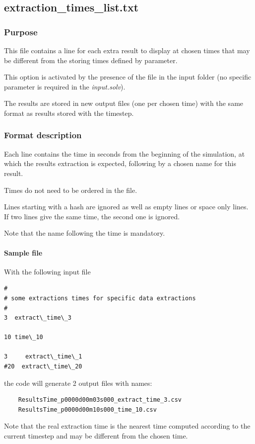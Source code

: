 \subsection{extraction\_times\_list.txt}
\subsubsection{Purpose}

This file contains a line for each extra result to display at chosen times that may be different from the storing times defined by  parameter.

This option is activated by the presence of the file in the input folder (no specific parameter is required in the \emph{input.solv}).

The results are stored in new output files (one per chosen time) with the same format as results stored with the  timestep. 

\subsubsection{Format description}
 Each line contains the time in seconds from the beginning of the simulation, at which the results extraction is expected, following by a chosen name for this result.

Times do not need to be ordered in the file.

Lines starting with a hash are ignored as well as empty lines or space only lines.
If two lines give the same time, the second one is ignored. 

Note that the name following the time is mandatory.
\paragraph*{Sample file}
With the following input file

\begin{verbatim}
#
# some extractions times for specific data extractions
#
3  extract\_time\_3

10 time\_10
  
3     extract\_time\_1
#20  extract\_time\_20
\end{verbatim}

the code will generate 2 output files with names:
\begin{verbatim}
    ResultsTime_p0000d00m03s000_extract_time_3.csv
    ResultsTime_p0000d00m10s000_time_10.csv
\end{verbatim}

Note that the real extraction time is the nearest time computed according to the current timestep and may be different from the chosen time.